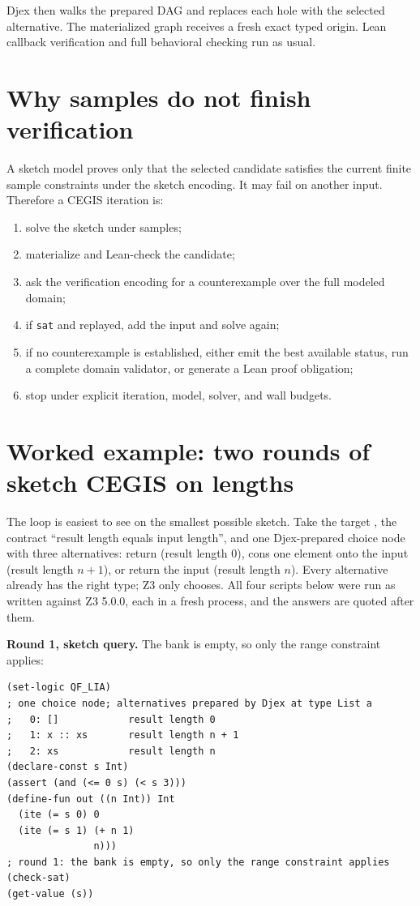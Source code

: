 \documentclass[10pt,letterpaper,oneside]{report}
\newcommand{\code}[1]{\texttt{\detokenize{#1}}}
\newcommand{\sat}{\texttt{sat}}
\begin{document}
Djex then walks the prepared DAG and replaces each hole with the selected alternative. The materialized graph receives a fresh exact typed origin. Lean callback verification and full behavioral checking run as usual.

\section{Why samples do not finish verification}

A sketch model proves only that the selected candidate satisfies the current finite sample constraints under the sketch encoding. It may fail on another input. Therefore a CEGIS iteration is:

\begin{enumerate}
\item solve the sketch under samples;
\item materialize and Lean-check the candidate;
\item ask the verification encoding for a counterexample over the full modeled domain;
\item if \sat{} and replayed, add the input and solve again;
\item if no counterexample is established, either emit the best available status, run a complete domain validator, or generate a Lean proof obligation;
\item stop under explicit iteration, model, solver, and wall budgets.
\end{enumerate}
\section{Worked example: two rounds of sketch CEGIS on lengths}
\label{sec:cegis-worked}

The loop is easiest to see on the smallest possible sketch. Take the target \code{List a -> List a}, the contract ``result length equals input length'', and one Djex-prepared choice node with three alternatives: return \code{[]} (result length $0$), cons one element onto the input (result length $n+1$), or return the input (result length $n$). Every alternative already has the right type; Z3 only chooses. All four scripts below were run as written against Z3 5.0.0, each in a fresh process, and the answers are quoted after them.

\textbf{Round 1, sketch query.} The bank is empty, so only the range constraint applies:

\begin{lstlisting}[language=SMTLib,caption={Round 1: choose an alternative with no samples.}]
(set-logic QF_LIA)
; one choice node; alternatives prepared by Djex at type List a
;   0: []            result length 0
;   1: x :: xs       result length n + 1
;   2: xs            result length n
(declare-const s Int)
(assert (and (<= 0 s) (< s 3)))
(define-fun out ((n Int)) Int
  (ite (= s 0) 0
  (ite (= s 1) (+ n 1)
               n)))
; round 1: the bank is empty, so only the range constraint applies
(check-sat)
(get-value (s))
\end{lstlisting}
\end{document}
